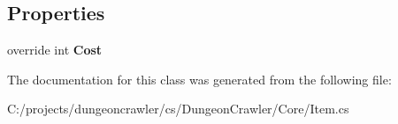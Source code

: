 \subsection*{Properties}
\begin{DoxyCompactItemize}
\item 
\hypertarget{class_dungeon_crawler_1_1_core_1_1_armour_a3cce8699f02701ab45625b7cb97f16ad}{}override int {\bfseries Cost}\label{class_dungeon_crawler_1_1_core_1_1_armour_a3cce8699f02701ab45625b7cb97f16ad}

\end{DoxyCompactItemize}


The documentation for this class was generated from the following file\+:\begin{DoxyCompactItemize}
\item 
C\+:/projects/dungeoncrawler/cs/\+Dungeon\+Crawler/\+Core/Item.\+cs\end{DoxyCompactItemize}
